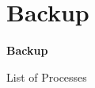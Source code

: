 \section*{Backup}
\begin{frame}
	\begin{center}
		\textbf{\Huge Backup}
	\end{center}
\end{frame}

\begin{frame}{List of Processes}


\end{frame}



